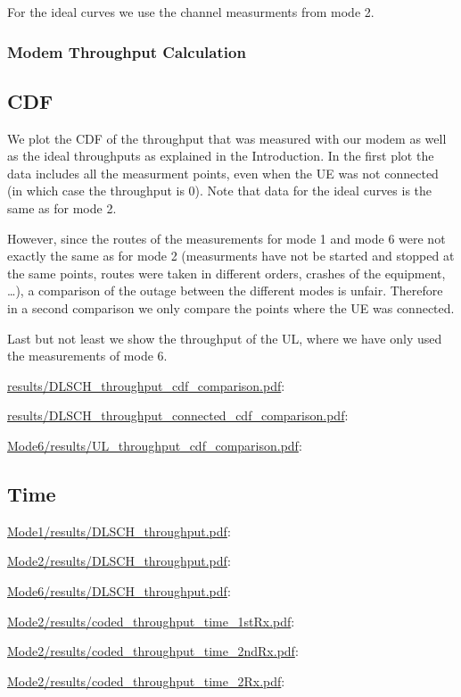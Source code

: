 \documentclass[a4paper,10pt]{article}
\newcommand{\printfile}[2][]{
 \begin{minipage}{8cm}
  \centering
  \url{#2}: #1

 \end{minipage}
}
\begin{document}
For the ideal curves we use the channel measurments from mode 2.

\subsubsection{Modem Throughput Calculation}



\subsection{CDF}


We plot the CDF of the throughput that was measured with our modem as well as the ideal throughputs as explained in the Introduction. In the first plot the data includes all the measurment points, even when the UE was not connected (in which case the throughput is 0). Note that data for the ideal curves is the same as for mode 2. 

However, since the routes of the measurements for mode 1 and mode 6 were not exactly the same as for mode 2 (measurments have not be started and stopped at the same points, routes were taken in different orders, crashes of the equipment, \ldots), a comparison of the outage between the different modes is unfair. Therefore in a second comparison we only compare the points where the UE was connected. 

Last but not least we show the throughput of the UL, where we have only used the measurements of mode 6.

\printfile{results/DLSCH_throughput_cdf_comparison.pdf}
\printfile{results/DLSCH_throughput_connected_cdf_comparison.pdf}

\printfile{Mode6/results/UL_throughput_cdf_comparison.pdf}


\subsection{Time}

\printfile{Mode1/results/DLSCH_throughput.pdf}
\printfile{Mode2/results/DLSCH_throughput.pdf}

\printfile{Mode6/results/DLSCH_throughput.pdf}
\printfile{Mode2/results/coded_throughput_time_1stRx.pdf}

\printfile{Mode2/results/coded_throughput_time_2ndRx.pdf}
\printfile{Mode2/results/coded_throughput_time_2Rx.pdf}
\end{document}
